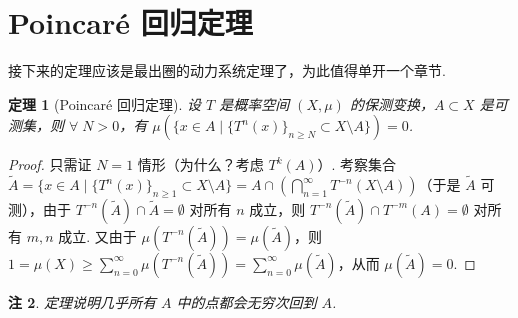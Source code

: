 \documentclass[11pt, a4paper, oneside]{ctexart}
\newtheorem{theorem}{定理}[section]
\newtheorem{remark}[theorem]{注}
\begin{document}
    \section{Poincaré 回归定理}
    接下来的定理应该是最出圈的动力系统定理了，为此值得单开一个章节.
    \begin{theorem}[Poincaré 回归定理]
        设 $T$ 是概率空间 $(X,\mu)$ 的保测变换，$A\subset X$ 是可测集，则 $\forall\; N>0$，有 $\mu(\{x\in A\mid {\{T^n(x)\}}_{n\geq N}\subset X\setminus A\})=0$.
    \end{theorem}
    \begin{proof}
        只需证 $N=1$ 情形（为什么？考虑 $T^k(A)$）. 考察集合 $\tilde{A}=\{x\in A\mid {\{T^n(x)\}}_{n\geq 1}\subset X\setminus A\}=A\cap (\bigcap\limits_{n=1}^{\infty} T^{-n}(X\setminus A))$（于是 $\tilde{A}$ 可测），由于 $T^{-n}(\tilde{A})\cap \tilde{A}=\emptyset$ 对所有 $n$ 成立，则 $T^{-n}(\tilde{A})\cap T^{-m}(A)=\emptyset$ 对所有 $m,n$ 成立. 又由于 $\mu(T^{-n}(\tilde{A}))=\mu(\tilde{A})$，则 $1=\mu(X)\geq \sum\limits_{n=0}^{\infty} \mu(T^{-n}(\tilde{A})) = \sum\limits_{n=0}^{\infty} \mu(\tilde{A})$，从而 $\mu(\tilde{A})=0$.
    \end{proof}
    \begin{remark}
        定理说明几乎所有 $A$ 中的点都会无穷次回到 $A$.
    \end{remark}
\end{document}
